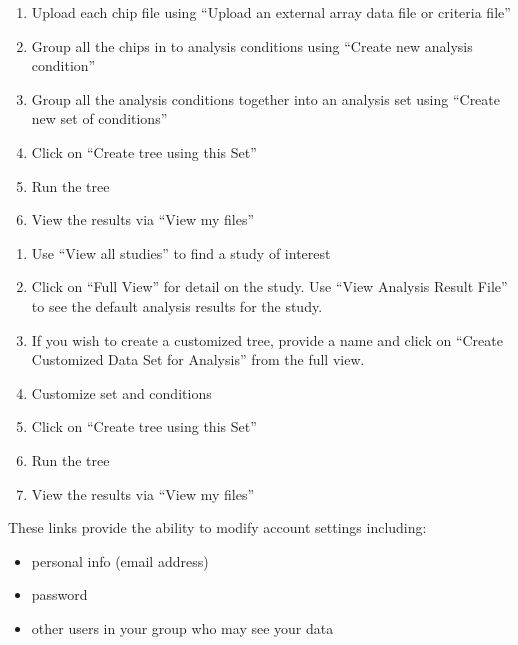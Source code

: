 \documentclass{compactslide} %
\begin{document}
\begin{slide}
\begin{enumerate}
\item Upload each chip file using ``Upload an external array data file or
criteria file''
\item Group all the chips in to analysis conditions using ``Create new
analysis condition''
\item Group all the analysis conditions together into an analysis set using
``Create new set of conditions''
\item Click on ``Create tree using this Set''
\item Run the tree
\item View the results via ``View my files''
\end{enumerate}
\end{slide}

\begin{slide}
\begin{enumerate}
\item Use ``View all studies'' to find a study of interest
\item Click on ``Full View'' for detail on the study.  Use ``View Analysis
Result File'' to see the default analysis results for the study.
\item If you wish to create a customized tree, provide a name and 
click on ``Create Customized Data Set for Analysis'' from the full view.
\item Customize set and conditions
\item Click on ``Create tree using this Set''
\item Run the tree
\item View the results via ``View my files''
\end{enumerate}
\end{slide}

\begin{slide}

These links provide the ability to modify account settings including:
\begin{itemize}
\item personal info (email address)
\item password
\item other users in your group who may see your data
\end{itemize}
\end{slide}
\end{document}
